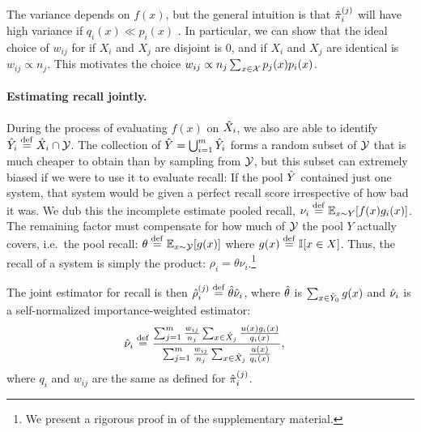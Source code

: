 The variance depends on $f(x)$, but the general intuition is that ${\hat{\pi}}_i^{(j)}$ will have high variance if $q_i(x) \ll p_i(x)$ .
In particular, we can show that the ideal choice  of $w_{ij}$ for if $X_i$ and $X_j$ are disjoint is $0$, and if $X_i$ and $X_j$ are identical is $w_{ij} \propto n_{j}$.
This motivates the choice $w_{ij} \propto n_{j} \sum_{x \in \mathcal{X}} p_j(x) p_i(x)$.

\paragraph{Estimating recall jointly.}
During the process of evaluating $f(x)$ on ${\hat{X}}_i$, we also are able to identify ${\hat{Y}}_i \stackrel{\rm def}{=} {\hat{X}}_i \cap \mathcal{Y}$.
The collection of ${\hat{Y}} = \bigcup_{i=1}^m {\hat{Y}}_i$ forms a random subset of $\mathcal{Y}$ that is much cheaper to obtain than by sampling from $\mathcal{Y}$, but this subset can extremely biased if we were to use it to evaluate recall: 
If the pool ${\hat{Y}}$ contained just one system, that system would be given a perfect recall score irrespective of how bad it was.
We dub this the incomplete estimate pooled recall, $\nu_i \stackrel{\rm def}{=} \mathbb{E}_{x \sim Y}[f(x) g_i(x)]$.
The remaining factor must compensate for how much of $\mathcal{Y}$ the pool $Y$ actually covers, i.e.\ the pool recall: $\theta \stackrel{\rm def}{=} \mathbb{E}_{x \sim \mathcal{Y}}[g(x)]$ where $g(x) \stackrel{\rm def}{=} \mathbb{I}[x \in X]$.
Thus, the recall of a system is simply the product: $\rho_i = \theta \nu_i$.\footnote{%
We present a rigorous proof in  of the supplementary material.}

The joint estimator for recall is then ${\hat{\rho}}_i^{(j)} \stackrel{\rm def}{=} {\hat{\theta}}{\hat{\nu}}_i$, where ${\hat{\theta}}$ is $\sum_{x \in {\hat{Y}}_0} g(x)$ and ${\hat{\nu}}_i$ is a self-normalized importance-weighted estimator:
\begin{align*}
  {\hat{\nu}}_i &\stackrel{\rm def}{=} \frac{\sum_{j=1}^m \frac{w_{ij}}{n_j} \sum_{x \in {\hat{X}}_j} \frac{u(x) g_i(x)}{q_i(x)}}{\sum_{j=1}^m \frac{w_{ij}}{n_j} \sum_{x \in {\hat{X}}_j} \frac{u(x)}{q_i(x)}},
\end{align*}
where $q_i$ and $w_{ij}$ are the same as defined for ${\hat{\pi}}_i^{(j)}$.

